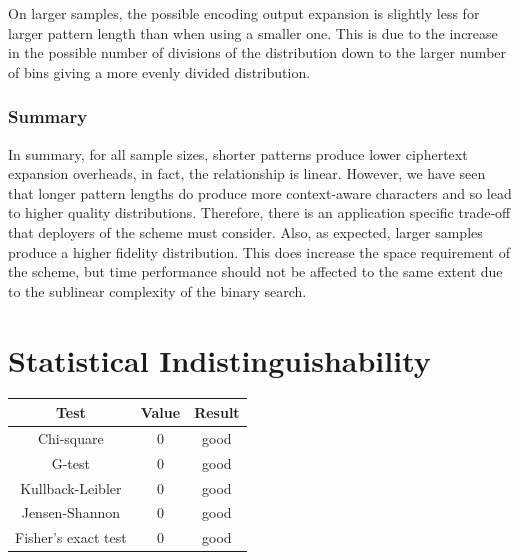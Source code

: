 \documentclass[ %
                    author={Samuel Russell},
                supervisor={Prof. Bogdan Warinschi},
                    degree={MEng},
                     title={Innocuous Ciphertexts},
                  subtitle={The DE-CENSOR Scheme},
                      type={Research},
                      year={2018} ]{dissertation}
\begin{document}
On larger samples, the possible encoding output expansion is slightly less for larger pattern length than when using a smaller one. This is due to the increase in the possible number of divisions of the distribution down to the larger number of bins giving a more evenly divided distribution.

\subsubsection{Summary}

In summary, for all sample sizes, shorter patterns produce lower ciphertext expansion overheads, in fact, the relationship is linear.
However, we have seen that longer pattern lengths do produce more context-aware characters and so lead to higher quality distributions.
Therefore, there is an application specific trade-off that deployers of the scheme must consider.
Also, as expected, larger samples produce a higher fidelity distribution.
This does increase the space requirement of the scheme, but time performance should not be affected to the same extent due to the sublinear complexity of the binary search.

\section{Statistical Indistinguishability}

\begin{table}[h]
\centering
\begin{tabular}{|c|c|c|}

\hline

Test					& Value		& Result\\

\hline

Chi-square				& 0			& good\\

G-test					& 0			& good\\

Kullback-Leibler		& 0			& good\\

Jensen-Shannon			& 0			& good\\

Fisher's exact test		& 0			& good\\

\hline

\end{tabular}

\end{table}
\end{document}
